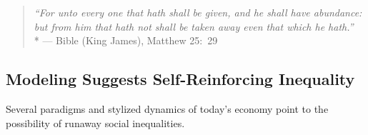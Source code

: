 \begin{quote}
	\emph{``For unto every one that hath shall be given, and he shall have abundance:
but from him that hath not shall be taken away even that which he hath.''}\\*
	--- Bible (King James), Matthew 25:~29
\end{quote}





\subsection[Models of Inequality]{Modeling Suggests Self-Reinforcing Inequality}
Several paradigms and stylized dynamics of today's economy point to the possibility of runaway social inequalities.





